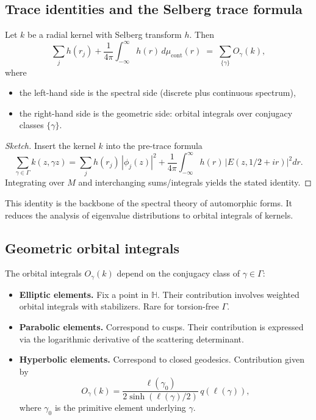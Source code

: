 \subsection{Trace identities and the Selberg trace formula}

\begin{theorem}
Let $k$ be a radial kernel with Selberg transform $h$.
Then
\[
  \sum_j h(r_j)
  + \frac{1}{4\pi}\int_{-\infty}^\infty h(r)\,d\mu_{\mathrm{cont}}(r)
  \;=\; \sum_{\{\gamma\}} O_\gamma(k),
\]
where
\begin{itemize}
  \item the left-hand side is the spectral side (discrete plus continuous spectrum),
  \item the right-hand side is the geometric side: orbital integrals over conjugacy classes $\{\gamma\}$.
\end{itemize}
\end{theorem}

\begin{proof}[Sketch]
Insert the kernel $k$ into the pre-trace formula
\[
  \sum_{\gamma\in \Gamma} k(z,\gamma z) = \sum_j h(r_j)\,|\phi_j(z)|^2 + \frac{1}{4\pi}\int_{-\infty}^\infty h(r)\,|E(z,1/2+ir)|^2 dr.
\]
Integrating over $M$ and interchanging sums/integrals yields the stated identity.
\end{proof}

\begin{remark}
This identity is the backbone of the spectral theory of automorphic forms. It reduces the analysis of eigenvalue distributions to orbital integrals of kernels.
\end{remark}

\subsection{Geometric orbital integrals}

The orbital integrals $O_\gamma(k)$ depend on the conjugacy class of $\gamma\in\Gamma$:

\begin{itemize}
  \item \textbf{Elliptic elements.} Fix a point in $\mathbb{H}$. Their contribution involves weighted orbital integrals with stabilizers. Rare for torsion-free $\Gamma$.
  \item \textbf{Parabolic elements.} Correspond to cusps. Their contribution is expressed via the logarithmic derivative of the scattering determinant.
  \item \textbf{Hyperbolic elements.} Correspond to closed geodesics. Contribution given by
  \[
    O_\gamma(k) = \frac{\ell(\gamma_0)}{2\sinh(\ell(\gamma)/2)}\,q(\ell(\gamma)),
  \]
  where $\gamma_0$ is the primitive element underlying $\gamma$.
\end{itemize}

